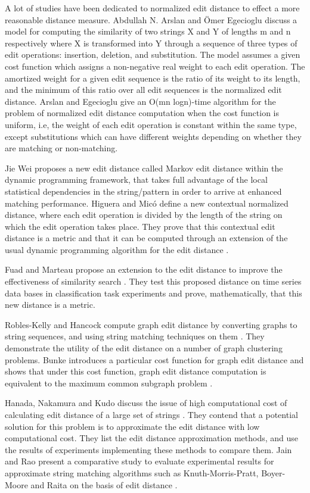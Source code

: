 \documentclass[conference]{IEEEtran}
\begin{document}
A lot of studies have been dedicated to normalized edit distance to effect a more reasonable distance measure.  Abdullah N. Arslan and \"{O}mer Egecioglu discuss a model for computing the similarity of two strings X and Y of lengths m and n respectively where X is transformed into Y through a sequence of three types of edit operations: insertion, deletion, and substitution. The model assumes a given cost function which assigns a non-negative real weight to each edit operation. The amortized weight for a given edit sequence is the ratio of its weight to its length, and the minimum of this ratio over all edit sequences is the normalized edit distance. Arslan and Egecioglu \cite{Arslan} give an  O(mn logn)-time algorithm for the problem of normalized edit distance computation when the cost function is uniform, i.e, the weight of each edit operation is constant within the same type, except substitutions which can have different weights depending on whether they are matching or non-matching. 

Jie Wei proposes a new edit distance called Markov edit distance \cite{Wei} within the dynamic programming framework, that takes full advantage of the local statistical dependencies in the string/pattern in order to arrive at enhanced matching performance. Higuera and Mic\'{o} define a new contextual normalized distance, where each edit operation is divided by the length of the string on which the edit operation takes place. They prove that this contextual edit distance is a metric and that it can be computed through an extension of the usual dynamic programming algorithm for the edit distance \cite{Higuera}.  

Fuad and Marteau propose an extension to the edit distance to improve the effectiveness of similarity search \cite{Fuad}. They test this proposed distance on time series data bases in classification task experiments and prove, mathematically, that this new distance is a metric.

Robles-Kelly and Hancock compute graph edit distance by converting graphs to string sequences, and using string matching techniques on them \cite{Kelly}. They demonstrate the utility of the edit distance on a number of graph clustering problems. Bunke introduces a particular cost function for graph edit distance and shows that under this cost function, graph edit distance computation is equivalent to the maximum common subgraph problem \cite{Bunke}. 

Hanada, Nakamura and Kudo discuss the issue of high computational cost of calculating edit distance of a large set of strings \cite{Hanada}. They contend that a potential solution for this problem is to approximate the edit distance with low computational cost. They list the edit distance approximation methods, and use the results of experiments implementing these methods to compare them. Jain and Rao present a comparative study to evaluate experimental results for approximate string matching algorithms such as Knuth-Morris-Pratt, Boyer-Moore and Raita on the basis of edit distance \cite{Shivani}.
\end{document}
